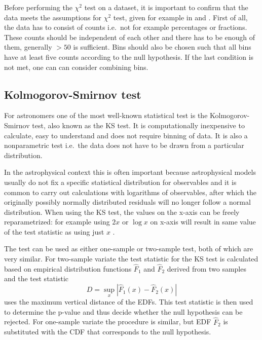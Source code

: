 \documentclass[english, oneside]{HYgradu}
\begin{document}
Before performing the $\chi^2$ test on a dataset, it is important to confirm that the data meets the assumptions for $\chi^2$ test, given for example in \citep{bock2010stats} and \citep{htk}. First of all, the data has to consist of counts i.e.\ not for example percentages or fractions. These counts should be independent of each other and there has to be enough of them, generally $>50$ is sufficient. Bins should also be chosen such that all bins have at least five counts according to the null hypothesis. If the last condition is not met, one can can consider combining bins. 


\subsection{Kolmogorov-Smirnov test}
For astronomers one of the most well-known statistical test is the Kolmogorov-Smirnov test, also known as the KS test. It is computationally inexpensive to calculate, easy to understand and does not require binning of data. It is also a nonparametric test i.e.\ the data does not have to be drawn from a particular distribution.

In the astrophysical context this is often important because astrophysical models usually do not fix a specific statistical distribution for observables and it is common to carry out calculations with logarithms of observables, after which the originally possibly normally distributed residuals  will no longer follow a normal distribution. When using the KS test, the values on the x-axis can be freely reparametrized: for example using $2x$ or $\log x$ on x-axis will result in same value of the test statistic as using just $x$ \citep{press2007numerical}.

The test can be used as either one-sample or two-sample test, both of which are very similar. For two-sample variate the test statistic for the KS test is calculated based on empirical distribution functions $\hat{F}_1$ and $\hat{F}_2$ derived from two samples and the test statistic
\begin{equation}
	D = \sup_{x} |\hat{F}_1(x) - \hat{F}_2(x)|
\end{equation}
uses the maximum vertical distance of the EDFs. This test statistic is then used to determine the p-value and thus decide whether the null hypothesis can be rejected. For one-sample variate the procedure is similar, but EDF $\hat{F}_2$ is substituted with the CDF that corresponds to the null hypothesis.
\end{document}
